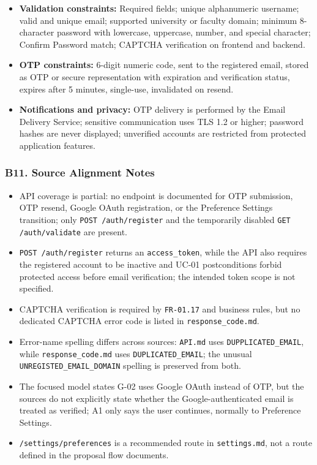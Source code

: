 \documentclass[12pt]{article}
\begin{document}
\begin{itemize}
\item \textbf{Validation constraints:} Required fields; unique alphanumeric username; valid and unique email; supported university or faculty domain; minimum 8-character password with lowercase, uppercase, number, and special character; Confirm Password match; CAPTCHA verification on frontend and backend.
\item \textbf{OTP constraints:} 6-digit numeric code, sent to the registered email, stored as OTP or secure representation with expiration and verification status, expires after 5 minutes, single-use, invalidated on resend.
\item \textbf{Notifications and privacy:} OTP delivery is performed by the Email Delivery Service; sensitive communication uses TLS 1.2 or higher; password hashes are never displayed; unverified accounts are restricted from protected application features.
\end{itemize}
\par\medskip

\hypertarget{sec:b11-source-alignment-notes}{}
\subsubsection*{B11. Source Alignment Notes}
\par\medskip

\begin{itemize}
\item API coverage is partial: no endpoint is documented for OTP submission, OTP resend, Google OAuth registration, or the Preference Settings transition; only \texttt{POST /auth/register} and the temporarily disabled \texttt{GET /auth/validate} are present.
\item \texttt{POST /auth/register} returns an \texttt{access\_token}, while the API also requires the registered account to be inactive and UC-01 postconditions forbid protected access before email verification; the intended token scope is not specified.
\item CAPTCHA verification is required by \texttt{FR-01.17} and business rules, but no dedicated CAPTCHA error code is listed in \texttt{response\_code.md}.
\item Error-name spelling differs across sources: \texttt{API.md} uses \texttt{DUPPLICATED\_EMAIL}, while \texttt{response\_code.md} uses \texttt{DUPLICATED\_EMAIL}; the unusual \texttt{UNREGISTED\_EMAIL\_DOMAIN} spelling is preserved from both.
\item The focused model states G-02 uses Google OAuth instead of OTP, but the sources do not explicitly state whether the Google-authenticated email is treated as verified; A1 only says the user continues, normally to Preference Settings.
\item \texttt{/settings/preferences} is a recommended route in \texttt{settings.md}, not a route defined in the proposal flow documents.
\end{itemize}
\par\medskip
\end{document}

